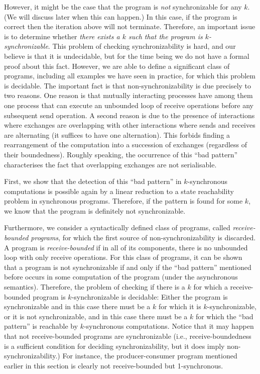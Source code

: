 However, it might be the case that the program is {\em not} synchronizable for any $k$. (We will discuss later when this can happen.) In this case, if the program is correct then the iteration above will not terminate. Therefore, an important issue is to determine whether {\em there exists a $k$ such that the program is $k$-synchronizable}. This problem of checking synchronizability is hard, and our believe is that it is undecidable, but for the time being we do not have a formal proof about this fact. However, we are able to define a significant class of programs, including all examples we have seen in practice, for which this problem is decidable.  The important fact is that non-synchronizability is due precisely to two reasons. One reason is that mutually interacting processes have among them one process that can execute an unbounded loop of receive operations before any subsequent send operation. 
A second reason is due to the presence of interactions where exchanges are overlapping with other interactions where sends and receives are alternating (it suffices to have one alternation). This forbids finding a rearrangement of the computation into a succession of exchanges (regardless of their boundedness). Roughly speaking, the occurrence of this “bad pattern” characterises the fact that overlapping exchanges are not serialisable. 

First, we show that the detection of this “bad pattern” in $k$-synchronous computations is possible again by a linear reduction to a state reachability problem in synchronous programs. Therefore, if the pattern is found for some $k$, we know that the program is definitely not synchronizable. 

Furthermore, we consider a syntactically defined class of programs, called {\em receive-bounded programs}, for which the first source of non-synchronizability is  discarded. A program is {\em receive-bounded} if in all of its components, there is no unbounded loop with only receive operations. For this class of programs, it can be shown that a program is not synchronizable if and only if the “bad pattern” mentioned before occurs in some computation of the program (under the asynchronous semantics). Therefore, the problem of checking if there is a $k$ for which a receive-bounded program is $k$-synchronizable is decidable: Either the program is synchronizable and in this case there must be a $k$ for which it is $k$-synchronizable, or it is not synchronizable, and in this case there must be a $k$ for which the “bad pattern” is reachable by $k$-synchronous computations. Notice that it may happen that not receive-bounded programs are synchronizable (i.e., receive-boundedness is a sufficient condition for deciding synchronizability, but it does imply non-synchronizability.) For instance, the producer-consumer program mentioned earlier in this section is clearly not receive-bounded but 1-synchronous. 

